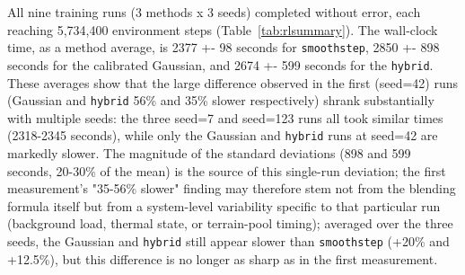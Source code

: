 All nine training runs (3 methods x 3 seeds) completed without error, each reaching 5,734,400 environment steps (Table~\ref{tab:rlsummary}). The wall-clock time, as a method average, is 2377 +- 98 seconds for \texttt{smoothstep}, 2850 +- 898 seconds for the calibrated Gaussian, and 2674 +- 599 seconds for the \texttt{hybrid}. These averages show that the large difference observed in the first (seed=42) runs (Gaussian and \texttt{hybrid} 56\% and 35\% slower respectively) shrank substantially with multiple seeds: the three seed=7 and seed=123 runs all took similar times (2318-2345 seconds), while only the Gaussian and \texttt{hybrid} runs at seed=42 are markedly slower. The magnitude of the standard deviations (898 and 599 seconds, 20-30\% of the mean) is the source of this single-run deviation; the first measurement's "35-56\% slower" finding may therefore stem not from the blending formula itself but from a system-level variability specific to that particular run (background load, thermal state, or terrain-pool timing); averaged over the three seeds, the Gaussian and \texttt{hybrid} still appear slower than \texttt{smoothstep} (+20\% and +12.5\%), but this difference is no longer as sharp as in the first measurement.
